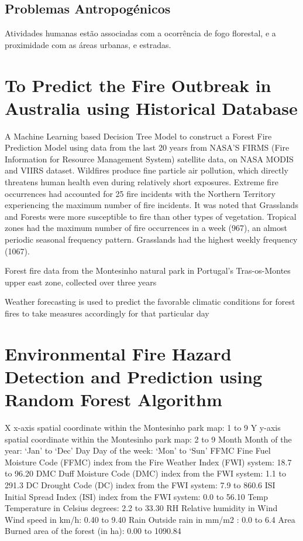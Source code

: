 \documentclass{article}
\begin{document}
\subsection{Problemas Antropogénicos}
Atividades humanas estão associadas com a ocorrência de fogo florestal, e a proximidade com as áreas urbanas, e estradas.


\section{To Predict the Fire Outbreak in Australia using 
Historical Database \cite{9964603}}
A Machine Learning based Decision Tree
Model to construct a Forest Fire Prediction Model using data
from the last 20 years from NASA'S FIRMS (Fire Information for Resource Management System) satellite data, on NASA MODIS and VIIRS dataset.
Wildfires produce fine particle air pollution, which directly
threatens human health even during relatively short
exposures.
Extreme fire occurrences had accounted for 25%
fire incidents with the Northern Territory experiencing the
maximum number of fire incidents. It was noted that
Grasslands and Forests were more susceptible to fire than
other types of vegetation.
Tropical zones had the maximum number of fire
occurrences in a week (967), an almost periodic seasonal
frequency pattern. Grasslands had the highest weekly
frequency (1067).


Forest fire data from the Montesinho 
natural park in Portugal’s Tras-os-Montes upper east zone, 
collected over three years

Weather forecasting is used to 
predict the favorable climatic conditions for forest fires to 
take measures accordingly for that particular day

\section{Environmental Fire Hazard Detection and 
Prediction using Random Forest Algorithm \cite{9726029}}
X x-axis spatial coordinate within the Montesinho park map: 1 to 9
Y y-axis spatial coordinate within the Montesinho park map: 2 to 9
Month Month of the year: ‘Jan’ to ‘Dec’
Day Day of the week: ‘Mon’ to ‘Sun’
FFMC Fine Fuel Moisture Code (FFMC) index from the Fire Weather 
Index (FWI) system: 18.7 to 96.20
DMC Duff Moisture Code (DMC) index from the FWI system: 1.1 to 
291.3
DC Drought Code (DC) index from the FWI system: 7.9 to 860.6
ISI Initial Spread Index (ISI) index from the FWI system: 0.0 to 
56.10
Temp Temperature in Celsius degrees: 2.2 to 33.30
RH Relative humidity in %
Wind Wind speed in km/h: 0.40 to 9.40
Rain Outside rain in mm/m2 : 0.0 to 6.4
Area Burned area of the forest (in ha): 0.00 to 1090.84
\end{document}
